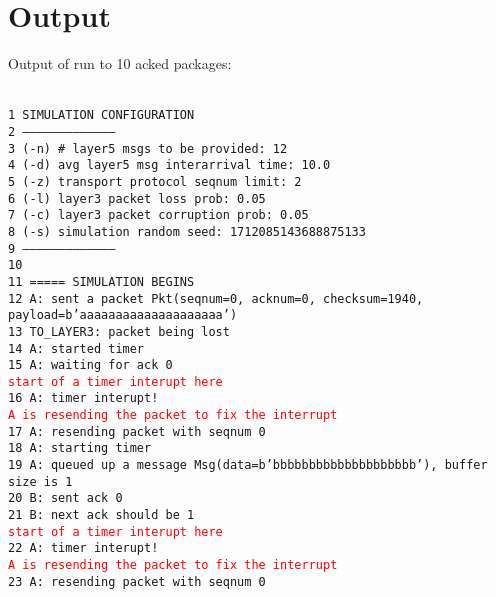 \documentclass{article}
\begin{document}
\section{Output}
Output of run to 10 acked packages:

\newcommand{\an}[1]{\hspace*{10mm} \textcolor{red}{#1}}
\texttt{\\1 SIMULATION CONFIGURATION\\
2 --------------------------------------\\
3 (-n) \# layer5 msgs to be provided:      12\\
4 (-d) avg layer5 msg interarrival time:  10.0\\
5 (-z) transport protocol seqnum limit:   2\\
6 (-l) layer3 packet loss prob:           0.05\\
7 (-c) layer3 packet corruption prob:     0.05\\
8 (-s) simulation random seed:            1712085143688875133\\
9 --------------------------------------\\
10\\
11 ===== SIMULATION BEGINS\\
12 A: sent a packet Pkt(seqnum=0, acknum=0, checksum=1940, payload=b'aaaaaaaaaaaaaaaaaaaa')\\
13           \hspace*{10mm} TO\_LAYER3: packet being lost\\
14 A: started timer\\
15 A: waiting for ack 0\\
\an{start of a timer interupt here}\\
16 A: timer interupt!\\
\an{A is resending the packet to fix the interrupt}\\
17 A: resending packet with seqnum 0\\
18 A: starting timer\\
19 A: queued up a message Msg(data=b'bbbbbbbbbbbbbbbbbbbb'), buffer size is 1\\
20 B: sent ack 0\\
21 B: next ack should be 1\\
\an{start of a timer interupt here}\\
22 A: timer interupt!\\
\an{A is resending the packet to fix the interrupt}\\
23 A: resending packet with seqnum 0\\
}
\end{document}
